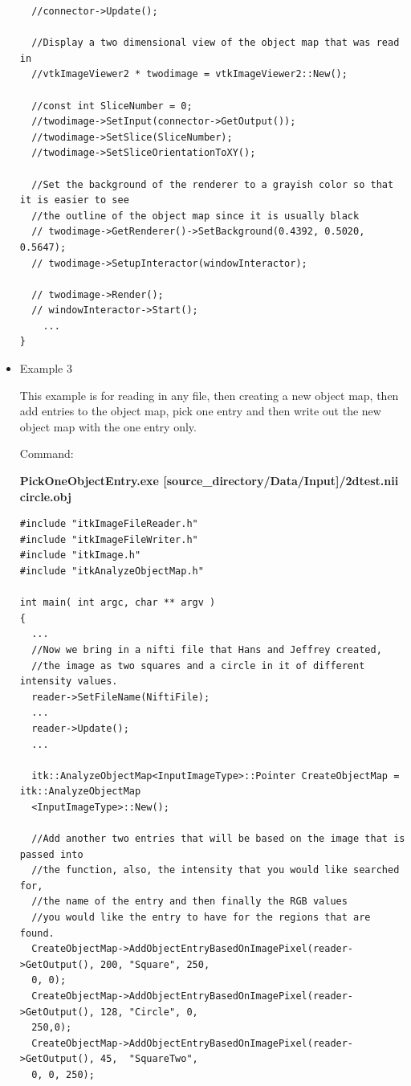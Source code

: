 \documentclass{InsightArticle}
\begin{document}
\begin{itemize}
\begin{verbatim}
  //connector->Update();
  
  //Display a two dimensional view of the object map that was read in
  //vtkImageViewer2 * twodimage = vtkImageViewer2::New();
  
  //const int SliceNumber = 0;
  //twodimage->SetInput(connector->GetOutput());
  //twodimage->SetSlice(SliceNumber);
  //twodimage->SetSliceOrientationToXY();
  
  //Set the background of the renderer to a grayish color so that it is easier to see
  //the outline of the object map since it is usually black
  // twodimage->GetRenderer()->SetBackground(0.4392, 0.5020, 0.5647);
  // twodimage->SetupInteractor(windowInteractor);
   
  // twodimage->Render();
  // windowInteractor->Start();
	...
}
\end{verbatim} \normalsize
                                                                               
\item Example 3

This example is for reading in any file, then creating a new object map, then add entries to the object map, pick one entry and then write out the new object map with the one entry only.

Command:

\textbf{PickOneObjectEntry.exe [source\_directory/Data/Input]/2dtest.nii circle.obj}

\small \begin{verbatim}
#include "itkImageFileReader.h"
#include "itkImageFileWriter.h"
#include "itkImage.h"
#include "itkAnalyzeObjectMap.h"

int main( int argc, char ** argv )
{
  ...
  //Now we bring in a nifti file that Hans and Jeffrey created, 
  //the image as two squares and a circle in it of different intensity values.
  reader->SetFileName(NiftiFile);
  ...
  reader->Update();
  ...
  
  itk::AnalyzeObjectMap<InputImageType>::Pointer CreateObjectMap = itk::AnalyzeObjectMap
  <InputImageType>::New();
  
  //Add another two entries that will be based on the image that is passed into 
  //the function, also, the intensity that you would like searched for, 
  //the name of the entry and then finally the RGB values
  //you would like the entry to have for the regions that are found.
  CreateObjectMap->AddObjectEntryBasedOnImagePixel(reader->GetOutput(), 200, "Square", 250,
  0, 0);
  CreateObjectMap->AddObjectEntryBasedOnImagePixel(reader->GetOutput(), 128, "Circle", 0,
  250,0);
  CreateObjectMap->AddObjectEntryBasedOnImagePixel(reader->GetOutput(), 45,  "SquareTwo", 
  0, 0, 250);
  

\end{verbatim}
\end{itemize}
\end{document}
